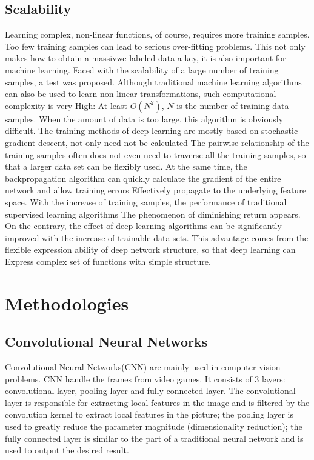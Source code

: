 \documentclass[11pt,en]{elegantpaper}
\begin{document}
\subsection{Scalability}
Learning complex, non-linear functions, of course, requires more training samples. Too few training samples can lead to serious over-fitting problems. This not only makes how to obtain a massivwe labeled data a key, it is also important for machine learning. Faced with the scalability of a large number of training samples, a test was proposed. Although traditional machine learning algorithms can also be used to learn non-linear transformations, such computational complexity is very High: At least $O(N^2)$, $N$ is the number of training data samples. When the amount of data is too large, this algorithm is obviously difficult. The training methods of deep learning are mostly based on stochastic gradient descent, not only need not be calculated The pairwise relationship of the training samples often does not even need to traverse all the training samples, so that a larger data set can be flexibly used. At the same time, the backpropagation algorithm can quickly calculate the gradient of the entire network and allow training errors Effectively propagate to the underlying feature space\cite{37}. With the increase of training samples, the performance of traditional supervised learning algorithms The phenomenon of diminishing return appears. On the contrary, the effect of deep learning algorithms can be significantly improved with the increase of trainable data sets. This advantage comes from the flexible expression ability of deep network structure, so that deep learning can Express complex set of functions with simple structure.

\section{Methodologies}
\subsection{Convolutional Neural Networks}
Convolutional Neural Networks(CNN) are mainly used in computer vision problems. CNN handle the frames from video games. It consists of 3 layers: convolutional layer, pooling layer and fully connected layer. The convolutional layer is responsible for extracting local features in the image and is filtered by the convolution kernel to extract local features in the picture; the pooling layer is used to greatly reduce the parameter magnitude (dimensionality reduction); the fully connected layer is similar to the part of a traditional neural network and is used to output the desired result.
\end{document}
